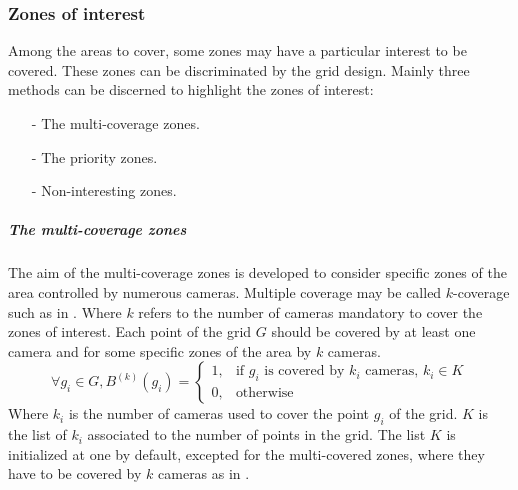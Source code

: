 \subsubsection{Zones of interest} \label{sec:zoneOfInterest}
Among the areas to cover, some zones may have a particular interest to be covered. These zones can be discriminated by the grid design. 
Mainly three methods can be discerned to highlight the zones of interest:
\begin{itemize}
	\item[-]	The multi-coverage zones.
	\item[-]	The priority zones.  
	\item[-]	Non-interesting zones.
\end{itemize}
 

\subparagraph{The multi-coverage zones}
The aim of the multi-coverage zones is developed to consider specific zones of the area controlled by numerous cameras.  Multiple coverage may be called $k$-coverage such as in \cite{174*zhang2016}. Where $k$ refers  to the number of cameras mandatory to cover the zones of interest. 
Each point of the grid $G$ should be covered by at least one camera and for some specific zones of the area by $k$ cameras.\\

\begin{equation}\label{eq:PciK}
\forall g_i \in G, B^{(k)}(g_i)= \begin{cases} 1, & \mbox{if } g_i\mbox{ is covered by $k_i$ cameras, } k_i \in K \\ 0, & \mbox{otherwise}   \end{cases}
\end{equation}
Where $k_i$ is the number of cameras used to cover the point $g_i$ of the grid. $K$ is the list of $k_i$ associated to the number of points in the grid. The list $K$ is initialized at one by default, excepted for the multi-covered zones,  where they have to be covered  by $k$ cameras as in \cite{82*chrysostomou2012}. 

